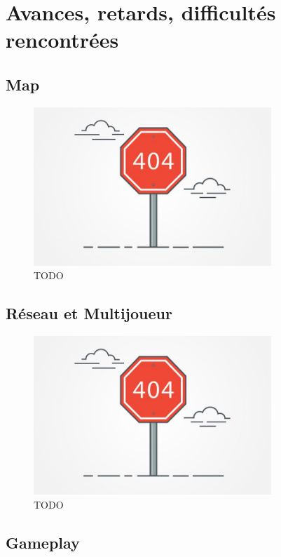 \documentclass[12pt]{report}
\begin{document}
\chapter{Avances, retards, difficultés rencontrées}

\section*{Map}

\begin{figure}[H]
    \centering
    \includegraphics[width=0.8\textwidth]{404}
    \caption{TODO}
\end{figure}

\section*{Réseau et Multijoueur}

\begin{figure}[H]
    \centering
    \includegraphics[width=0.8\textwidth]{404}
    \caption{TODO}
\end{figure}

\section*{Gameplay}
\end{document}
